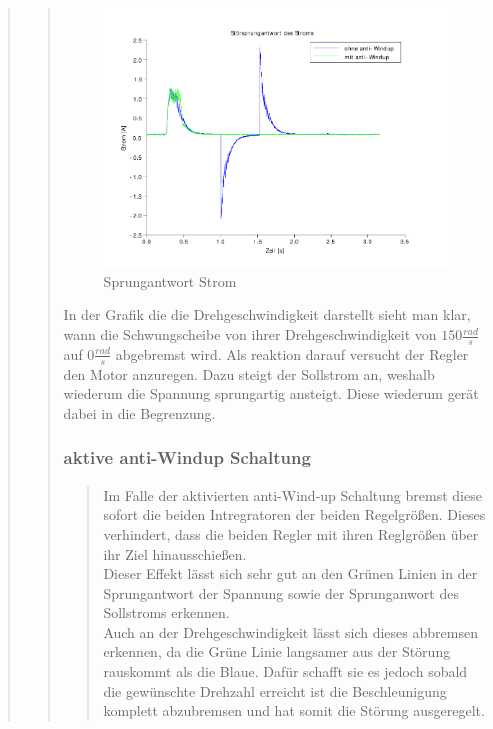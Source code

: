\begin{quote}
\begin{quote}
        \begin{figure}[H]
        \centering
            \includegraphics[scale=0.8, trim = 0.5cm 0.5cm 2cm 0.5cm,
            clip]{./Bilder/windup_sprungantwort_Strom}    
            \caption{Sprungantwort Strom}
        \end{figure}    
        
        In der Grafik die die Drehgeschwindigkeit darstellt sieht man klar, wann die Schwungscheibe von ihrer
        Drehgeschwindigkeit von $150 \frac{rad}{s}$ auf $0\frac{rad}{s}$ abgebremst wird. Als reaktion darauf versucht
        der Regler den Motor anzuregen. Dazu steigt der Sollstrom an, weshalb wiederum die Spannung sprungartig
        ansteigt. Diese wiederum gerät dabei in die Begrenzung.\\
        \subsubsection{aktive anti-Windup Schaltung}
		\begin{quote}
            Im Falle der aktivierten anti-Wind-up Schaltung bremst diese sofort die beiden Intregratoren der beiden
            Regelgrößen. Dieses verhindert, dass die beiden Regler mit ihren Reglgrößen über ihr Ziel hinausschießen.\\
            Dieser Effekt lässt sich sehr gut an den Grünen Linien in der Sprungantwort der Spannung sowie der
            Sprunganwort des Sollstroms erkennen.\\
            Auch an der Drehgeschwindigkeit lässt sich dieses abbremsen erkennen, da die Grüne Linie langsamer aus der
            Störung rauskommt als die Blaue. Dafür schafft sie es jedoch sobald die gewünschte Drehzahl erreicht ist die
            Beschleunigung komplett abzubremsen und hat somit die Störung ausgeregelt.\vspace{1em}
			

\end{quote}
\end{quote}
\end{quote}
